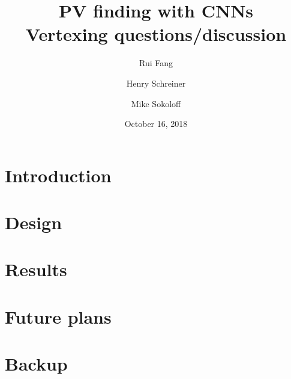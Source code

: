\documentclass[aspectratio=169, 10pt]{beamer}
\title[PV finding with CNNs: Vertexing questions/discussion]{PV finding with CNNs\\{\small Vertexing questions/discussion}}
\author[Fang, Schreiner, Sokoloff]{Rui Fang \and Henry Schreiner \and Mike Sokoloff}
\institute{The University of Cincinnati}
\date{October 16, 2018}
\begin{document}
\begin{frame}
\titlepage
\end{frame}

\section{Introduction}


\section{Design}


\section{Results}


\section{Future plans}


\backupbegin
\section{Backup}

\backupend
\end{document}
